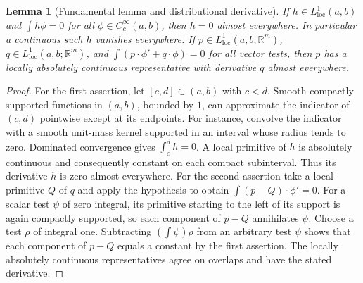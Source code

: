 \documentclass[11pt,oneside,openany]{book}
\theoremstyle{plain}
\newtheorem{lemma}[theorem]{Lemma}
\theoremstyle{definition}
\theoremstyle{remark}
\begin{document}
\begin{lemma}[Fundamental lemma and distributional derivative]
\label{lem:variation-fundamental}
If \(h\in L^1_{\mathrm{loc}}(a,b)\) and
\(\int h\phi=0\) for all \(\phi\in C_c^\infty(a,b)\), then \(h=0\)
almost everywhere. In particular a continuous such \(h\) vanishes
everywhere. If \(p\in L^1_{\mathrm{loc}}(a,b;\mathbb R^m)\),
\(q\in L^1_{\mathrm{loc}}(a,b;\mathbb R^m)\), and
\(\int(p\cdot\phi'+q\cdot\phi)=0\) for all vector tests, then
\(p\) has a locally absolutely continuous representative with
derivative \(q\) almost everywhere.
\end{lemma}
\begin{proof}
For the first assertion, let \([c,d]\subset(a,b)\) with \(c<d\).
Smooth compactly supported functions in \((a,b)\), bounded by
\(1\), can approximate the indicator of \((c,d)\) pointwise
except at its endpoints. For instance, convolve the indicator
with a smooth unit-mass kernel supported in an interval whose
radius tends to zero. Dominated convergence gives
\(\int_c^d h=0\). A local primitive of \(h\) is absolutely
continuous and consequently constant on each compact
subinterval. Thus its derivative \(h\) is zero almost everywhere.
For the second assertion take a local primitive \(Q\) of \(q\)
and apply the hypothesis to obtain
\(\int(p-Q)\cdot\phi'=0\). For a scalar test \(\psi\) of zero
integral, its primitive starting to the left of its support is
again compactly supported, so each component of \(p-Q\)
annihilates \(\psi\). Choose a test \(\rho\) of integral one.
Subtracting \((\int\psi)\rho\) from an arbitrary test \(\psi\)
shows that each component of \(p-Q\) equals a constant by the
first assertion. The locally absolutely continuous
representatives agree on overlaps and have the stated derivative.
\end{proof}
\end{document}
